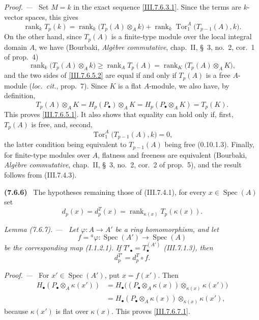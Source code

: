 \documentclass[10pt,oneside]{book}
\newcommand{\kres}{\kappa}
\newcommand{\Spec}{\operatorname{Spec}}
\newcommand{\Tor}{\operatorname{Tor}}
\newcommand{\sref}[2][]{(#2)}
\newcommand{\oldpage}[2][]{\setcounter{footnote}{0}\marginpar{\scriptsize\textbf{#1}~|~#2}\ignorespaces}
\newenvironment{env}[1][]{\par\medskip\noindent\textbf{(#1)}\ }{\par}
\newenvironment{lemma}[1][]{\par\medskip\noindent\itshape Lemma (#1). ---\ }{\par}
\newenvironment{proof}{\par\medskip\noindent\textit{Proof. ---\ }}{\par}
\begin{document}
\begin{proof}
Set $M=k$ in the exact sequence \eqref{III.7.6.3.1}.  Since
the terms are $k$-vector spaces, this gives
\[
  \operatorname{rank}_k T_p(k)
  =
  \operatorname{rank}_k\bigl(T_p(A)\otimes_A k\bigr)
  +
  \operatorname{rank}_k
  \Tor_1^A\bigl(T_{p-1}(A),k\bigr).
\]
On the other hand, since $T_p(A)$ is a finite-type module
over the local integral domain $A$, we have (Bourbaki,
\emph{Alg\`ebre commutative}, chap.~II, \S~3, no.~2,
cor.~1 of prop.~4)
\[
  \operatorname{rank}_k\bigl(T_p(A)\otimes_A k\bigr)
  \geq
  \operatorname{rank}_A T_p(A)
  =
  \operatorname{rank}_K\bigl(T_p(A)\otimes_A K\bigr),
  \tag{7.6.5.2}\label{III.7.6.5.2}
\]
and the two sides of \eqref{III.7.6.5.2} are equal if and
only if $T_p(A)$ is a free $A$-module (\emph{loc.\ cit.},
prop.~7).  Since $K$ is a flat $A$-module, we also have, by
definition,
\[
  T_p(A)\otimes_A K
  =
  H_p(P_\bullet)\otimes_A K
  =
  H_p(P_\bullet\otimes_A K)
  =
  T_p(K).
\]
This proves \eqref{III.7.6.5.1}.  It also shows that equality
can hold only if, first, $T_p(A)$ is free, and, second,
\[
  \Tor_1^A\bigl(T_{p-1}(A),k\bigr)=0,
\]
the latter condition being equivalent to $T_{p-1}(A)$ being
free \sref[0]{0.10.1.3}.  Finally, for finite-type modules
over $A$, flatness and freeness are equivalent (Bourbaki,
\emph{Alg\`ebre commutative}, chap.~II, \S~3, no.~2,
cor.~2 of prop.~5), and the result follows from
\sref{III.7.4.3}.
\end{proof}

\begin{env}[7.6.6]
\label{III.7.6.6}
The hypotheses remaining those of \sref{III.7.4.1}, for
every $x\in\Spec(A)$ set
\[
  d_p(x)=d_p^T(x)
  =
  \operatorname{rank}_{\kres(x)}T_p(\kres(x)).
  \tag{7.6.6.1}\label{III.7.6.6.1}
\]
\end{env}

\begin{lemma}[7.6.7]
\label{III.7.6.7}
Let $\varphi:A\to A'$ be a ring homomorphism, and let
\[
  f={}^a\!\varphi:\Spec(A')\longrightarrow\Spec(A)
\]
be the corresponding map \sref[I]{I.1.2.1}.  If
$T'_\bullet=T_\bullet^{(A')}$ \sref{III.7.1.3}, then
\[
  d_p^{T'}=d_p^T\circ f.
  \tag{7.6.7.1}\label{III.7.6.7.1}
\]
\end{lemma}

\oldpage[III]{195}
\begin{proof}
For $x'\in\Spec(A')$, put $x=f(x')$.  Then
\begin{align*}
  H_\bullet(P_\bullet\otimes_A\kres(x'))
  &=
  H_\bullet\bigl(
    (P_\bullet\otimes_A\kres(x))
    \otimes_{\kres(x)}\kres(x')
  \bigr)\\
  &=
  H_\bullet(P_\bullet\otimes_A\kres(x))
  \otimes_{\kres(x)}\kres(x'),
\end{align*}
because $\kres(x')$ is flat over $\kres(x)$.  This proves
\eqref{III.7.6.7.1}.
\end{proof}
\end{document}
